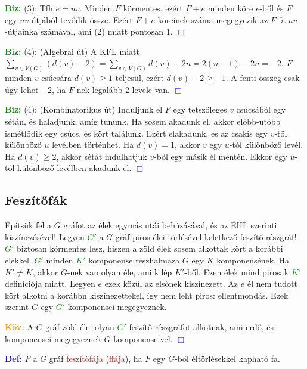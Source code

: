 \documentclass[../szamtud.tex]{subfiles}
\begin{document}
        \textcolor{green}{\textbf{Biz:}} (3): Tfh $e=uv$. Minden $F$ körmentes, ezért $F+e$ minden köre $e$-ből és $F$ egy $uv$-útjából tevődik össze. Ezért $F+e$ köreinek száma megegyezik az $F$ fa $uv$-útjainka számával, ami (2) miatt pontosan 1. \textcolor{blue}{$\Box$}

        \textcolor{green}{\textbf{Biz:}} (4): (Algebrai út) A KFL miatt $\sum_{v\in V(G)}(d(v)-2)=\sum_{v\in V(G)}d(v)-2n=2(n-1)-2n=-2$. $F$ minden $v$ csúcsára $d(v) \geq 1$ teljesül, ezért $d(v) - 2 \geq -1$. A fenti összeg csak úgy lehet $-2$, ha $F$-nek legalább 2 levele van. \textcolor{blue}{$\Box$}

        \textcolor{green}{\textbf{Biz:}} (4): (Kombinatorikus út) Induljunk el $F$ egy tetszőleges $v$ csúcsából egy sétán, és haladjunk, amíg tununk. Ha sosem akadunk el, akkor előbb-utóbb ismétlődik egy csúcs, és kört találunk. Ezért elakadunk, és az csakis egy $v$-től különböző $u$ levélben történhet. Ha $d(v)=1$, akkor $v$ egy $u$-tól különböző levél. Ha $d(v) \geq 2$, akkor sétát indulhatjuk $v$-ből egy másik él mentén. Ekkor egy $u$-tól különböző levélben akadunk el. \textcolor{blue}{$\Box$}

    \subsection{Feszítőfák}

        Építsük fel a $G$ gráfot az élek egymás utái behúzásával, és az ÉHL szerinti kiszínezésével! Legyen \textcolor{green}{$G'$} a $G$ gráf piros élei törlésével keletkező feszítő részgráf! \textcolor{green}{$G'$} biztosan körmentes lesz, hiszen a zöld élek sosem alkottak kört a korábbi élekkel. \textcolor{green}{$G'$} minden \textcolor{green}{$K'$} komponense részhalmaza $G$ egy $K$ komponensének. Ha $K' \neq K$, akkor $G$-nek van olyan éle, ami kilép $K'$-ből. Ezen élek mind pirosak \textcolor{green}{$K'$} definíciója miatt. Legyen $e$ ezek közül az elsőnek kiszínezett. Az $e$ él nem tudott kört alkotni a korábbn kiszínezettekel, így nem leht piros: ellentmondás. Ezek szerint $G$ egy \textcolor{green}{$G'$} komponensei megegyeznek.

        \textcolor{orange}{\textbf{Köv:}} A $G$ gráf zöld élei olyan \textcolor{green}{$G'$} feszítő részgráfot alkotnak, ami erdő, és komponensei megegyeznek $G$ komponenseivel. \textcolor{blue}{$\Box$}

        \textcolor{blue}{\textbf{Def:}} $F$ a $G$ gráf \textcolor{red}{feszítőfája} (\textcolor{red}{ffája}), ha $F$ egy $G$-ből éltörlésekkel kapható fa.
\end{document}
